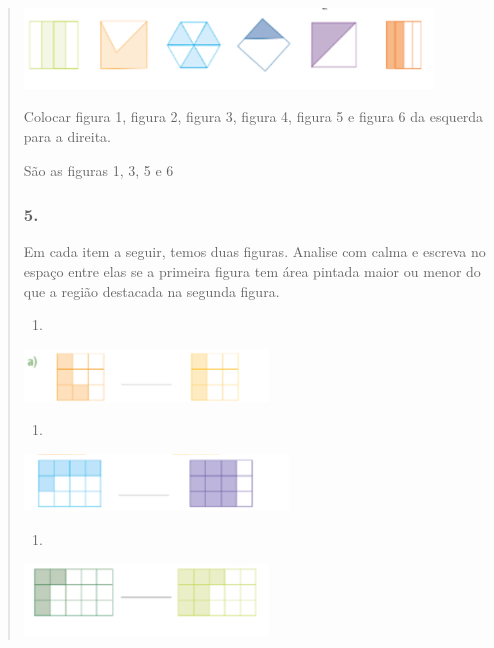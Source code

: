 \begin{mdframed}[linewidth=2pt,linecolor=salmao,roundcorner=2pt]
\begin{itemize}
{\begin{itemize}
\begin{escolha}
{\begin{quote}
{\begin{escolha}
{{{{\includegraphics[width=4.27537in,height=0.84174in]{media/image107.png}

Colocar figura 1, figura 2, figura 3, figura 4, figura 5 e figura 6 da
esquerda para a direita.

São as figuras 1, 3, 5 e 6

\subsubsection{5. }

Em cada item a seguir, temos duas figuras. Analise com calma e escreva no espaço
entre elas se a primeira figura tem área pintada maior ou menor do que a
região destacada na segunda figura.


\begin{enumerate}
\item
\end{enumerate}

\includegraphics[width=2.55022in,height=0.55005in]{media/image108.png}

\begin{enumerate}
\item
\end{enumerate}

\includegraphics[width=2.75857in,height=0.60005in]{media/image109.png}

\begin{enumerate}
\item
\end{enumerate}

\includegraphics[width=2.55022in,height=0.75006in]{media/image110.png}

}}}}
\end{escolha}}
\end{quote}}
\end{escolha}
\end{itemize}}
\end{itemize}
\end{mdframed}
